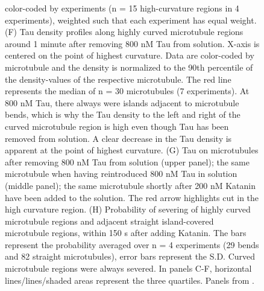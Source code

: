 \begin{figure}[h!]
{	color-coded by experiments (n = 15 high-curvature regions in 4 experiments), weighted such that each experiment has equal weight. (F) Tau density profiles along highly curved microtubule regions around 1 minute after removing 800 nM Tau from solution. X-axis is centered on the point of highest curvature. Data are color-coded by microtubule and the density is normalized to the 90th percentile of the density-values of the respective microtubule. The red line represents the median of n = 30 microtubules (7 experiments). At 800 nM Tau, there always were islands adjacent to microtubule bends, which is why the Tau density to the left and right of the curved microtubule region is high even though Tau has been removed from solution. A clear decrease in the Tau density is apparent at the point of highest curvature. (G) Tau on microtubules after removing 800 nM Tau from solution (upper panel); the same microtubule when having reintroduced 800 nM Tau in solution (middle panel); the same microtubule shortly after 200 nM Katanin have been added to the solution. The red arrow highlights cut in the high curvature region. (H) Probability of severing of highly curved microtubule regions and adjacent straight island-covered microtubule regions, within 150 s after adding Katanin. The bars represent the probability averaged over n = 4 experiments (29 bends and 82 straight microtubules), error bars represent the S.D. Curved microtubule regions were always severed. In panels C-F, horizontal lines/lines/shaded areas represent the three quartiles. Panels from \cite{Siahaan2019a}.
		}\label{Taucurve}
\end{figure}